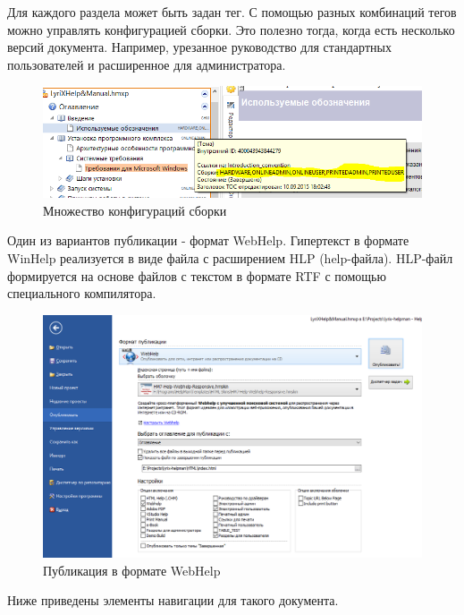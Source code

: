 		\FloatBarrier
	
		Для каждого раздела может быть задан тег. С помощью разных комбинаций тегов можно управлять конфигурацией сборки. Это полезно тогда, когда есть несколько версий документа. Например, урезанное руководство для стандартных пользователей и расширенное для администратора.
				
		\begin{figure}[h]
			\centering
			\includegraphics[width=0.7\linewidth]{images/multiple-builds}
			\caption{Множество конфигураций сборки}
			\label{fig:multiple-builds}
		\end{figure}
	
	
		\FloatBarrier
		Один из вариантов публикации - формат WebHelp. Гипертекст в формате WinHelp реализуется в виде файла с расширением HLP (help-файла). HLP-файл формируется на основе файлов с текстом в формате RTF с помощью специального компилятора.
	
		\begin{figure}[h]
			\centering
			\includegraphics[width=0.7\linewidth]{images/publishing}
			\caption{Публикация в формате WebHelp}
			\label{fig:publishing}
		\end{figure}
	
		\FloatBarrier
	
		Ниже приведены элементы навигации для такого документа.
	

